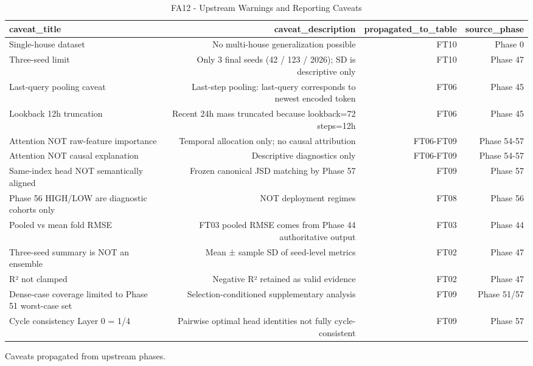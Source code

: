 \begin{table}[h!]
\centering
\caption{FA12 - Upstream Warnings and Reporting Caveats}
\label{tab:fa12\_-\_upstream\_warnings\_and\_reporting\_caveats}
\begin{tabular}{lrrr}
\toprule
caveat\_title & caveat\_description & propagated\_to\_table & source\_phase \\
\midrule
Single-house dataset & No multi-house generalization possible & FT10 & Phase 0 \\
Three-seed limit & Only 3 final seeds (42 / 123 / 2026); SD is descriptive only & FT10 & Phase 47 \\
Last-query pooling caveat & Last-step pooling: last-query corresponds to newest encoded token & FT06 & Phase 45 \\
Lookback 12h truncation & Recent 24h mass truncated because lookback=72 steps=12h & FT06 & Phase 45 \\
Attention NOT raw-feature importance & Temporal allocation only; no causal attribution & FT06-FT09 & Phase 54-57 \\
Attention NOT causal explanation & Descriptive diagnostics only & FT06-FT09 & Phase 54-57 \\
Same-index head NOT semantically aligned & Frozen canonical JSD matching by Phase 57 & FT09 & Phase 57 \\
Phase 56 HIGH/LOW are diagnostic cohorts only & NOT deployment regimes & FT08 & Phase 56 \\
Pooled vs mean fold RMSE & FT03 pooled RMSE comes from Phase 44 authoritative output & FT03 & Phase 44 \\
Three-seed summary is NOT an ensemble & Mean ± sample SD of seed-level metrics & FT02 & Phase 47 \\
R² not clamped & Negative R² retained as valid evidence & FT02 & Phase 47 \\
Dense-case coverage limited to Phase 51 worst-case set & Selection-conditioned supplementary analysis & FT09 & Phase 51/57 \\
Cycle consistency Layer 0 = 1/4 & Pairwise optimal head identities not fully cycle-consistent & FT09 & Phase 57 \\
\bottomrule
\end{tabular}
\vspace{4pt}
\footnotesize{Caveats propagated from upstream phases.}\\
\end{table}
